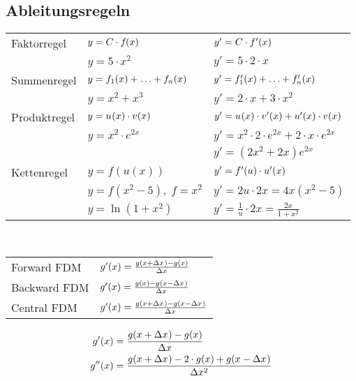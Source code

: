 \documentclass[
	final,
	a4paper,
	oneside,
	parskip=full,
	headings=standardclasses,
	headings=big,
	pointednumbers,
    fleqn
]{scrartcl}
\newcommand{\kl}[1]{{\left( #1 \right)}}
\begin{document}
    \subsection*{Ableitungsregeln}
    
    \renewcommand{\arraystretch}{1.25}
    \begin{tabular}{lll}
        Faktorregel  & $ y = C \cdot \fx$                   & $ y' = C \cdot \dfx $ \\
                     & $ y = 5 \cdot x^2 $                  & $ y' = 5 \cdot 2 \cdot x$ \\
        Summenregel  & $ y = \fx[1] + \ldots +  \fx[n] $    & $ y' = \dfx[1] + \ldots + \dfx[n] $\\
                     & $ y = x^2 + x^3$                     & $ y' = 2 \cdot x + 3 \cdot x^2$ \\
        Produktregel & $ y = \fx[][u] \cdot \fx[][v] $      & $ y' = \fx[][u] \cdot \dfx[][v] + \dfx[][u] \cdot \fx[][v] $ \\
                     & $ y = x^2 \cdot e^{2x}  $            & $ y' = x^2 \cdot 2\cdot e^{2x} + 2\cdot x \cdot e^{2x} $ \\
                     &                                      & $ y' = {\left( 2x^2 + 2x \right)} e^{2x} $ \\
        Kettenregel  & $ y = f\kl{u\kl{x}} $                & $ y' = \dfx[][f][u] \cdot \dfx[][u][x] $ \\
                     & $ y = f\kl{x^2 - 5}, \; f = x^2 $    & $ y' = 2 u \cdot 2x = 4x \kl{x^2 - 5} $ \\
                     & $ y = \ln\kl{1 + x^2} $              & $ y' = \frac{1}{u} \cdot 2x = \frac{2x}{1 + x^2} $ \\
    \end{tabular} \\

    {\renewcommand{\arraystretch}{1.75}
    \begin{tabular}{ll}
        Forward FDM  & $g'\kl{x} = \frac{g \kl{x + \dx} - g \kl{x}}{\dx}$ \\
        Backward FDM & $g'\kl{x} = \frac{g \kl{x} - g \kl{x - \dx}}{\dx}$ \\
        Central FDM  & $g'\kl{x} = \frac{g \kl{x + \dx} - g \kl{x - \dx}}{\dx}$
    \end{tabular}}
    
    \begin{align*}
        g'\kl{x}  &= \frac{g \kl{x + \dx} - g \kl{x}}{\dx} \\
        g''\kl{x} &= \frac{g \kl{x + \dx} - 2 \cdot g\kl{x} + g \kl{x - \dx}}{\dx[2]}
    \end{align*}
\end{document}
